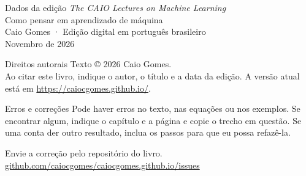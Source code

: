 \begin{quadro}{Dados da edição}
\emph{The CAIO Lectures on Machine Learning}\\
Como pensar em aprendizado de máquina\\
Caio Gomes · Edição digital em português brasileiro\\
Novembro de 2026
\end{quadro}

\begin{quadro}{Direitos autorais}
Texto © 2026 Caio Gomes.\\
Ao citar este livro, indique o autor, o título e a data da edição. A versão atual está em \url{https://caiocgomes.github.io/}.
\end{quadro}

\begin{quadro}{Erros e correções}
Pode haver erros no texto, nas equações ou nos exemplos. Se encontrar algum, indique o capítulo e a página e copie o trecho em questão. Se uma conta der outro resultado, inclua os passos para que eu possa refazê-la.

Envie a correção pelo repositório do livro.\\
\href{https://github.com/caiocgomes/caiocgomes.github.io/issues}{github.com/caiocgomes/caiocgomes.github.io/issues}
\end{quadro}
